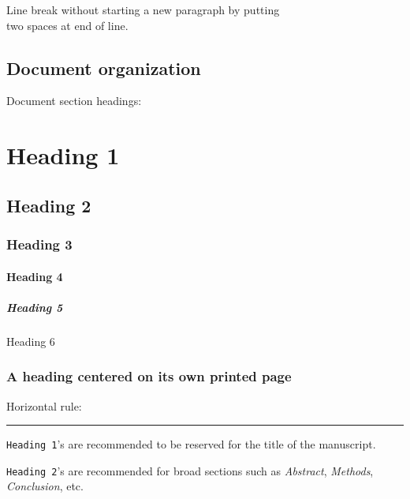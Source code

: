 \documentclass[
]{article}
\begin{document}
Line break without starting a new paragraph by putting\\
two spaces at end of line.

\hypertarget{document-organization}{%
\subsection{Document organization}\label{document-organization}}

Document section headings:

\hypertarget{heading-1}{%
\section{Heading 1}\label{heading-1}}

\hypertarget{heading-2}{%
\subsection{Heading 2}\label{heading-2}}

\hypertarget{heading-3}{%
\subsubsection{Heading 3}\label{heading-3}}

\hypertarget{heading-4}{%
\paragraph{Heading 4}\label{heading-4}}

\hypertarget{heading-5}{%
\subparagraph{Heading 5}\label{heading-5}}

Heading 6

\hypertarget{a-heading-centered-on-its-own-printed-page}{%
\subsubsection{A heading centered on its own printed page}\label{a-heading-centered-on-its-own-printed-page}}

Horizontal rule:

\begin{center}\rule{0.5\linewidth}{0.5pt}\end{center}

\texttt{Heading\ 1}'s are recommended to be reserved for the title of the manuscript.

\texttt{Heading\ 2}'s are recommended for broad sections such as \emph{Abstract}, \emph{Methods}, \emph{Conclusion}, etc.
\end{document}
